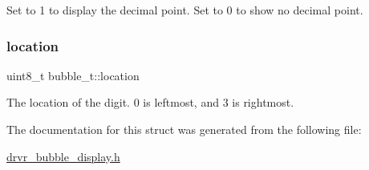 Set to 1 to display the decimal point. Set to 0 to show no decimal point. \mbox{\label{structbubble__t_ab471acaaeb2ef04b214dbb4ca1184ab3}} 
\subsubsection{\texorpdfstring{location}{location}}
{\footnotesize\ttfamily uint8\+\_\+t bubble\+\_\+t\+::location}

The location of the digit. 0 is leftmost, and 3 is rightmost. 

The documentation for this struct was generated from the following file\+:\begin{DoxyCompactItemize}
\item 
\mbox{\hyperlink{drvr__bubble__display_8h}{drvr\+\_\+bubble\+\_\+display.\+h}}\end{DoxyCompactItemize}
